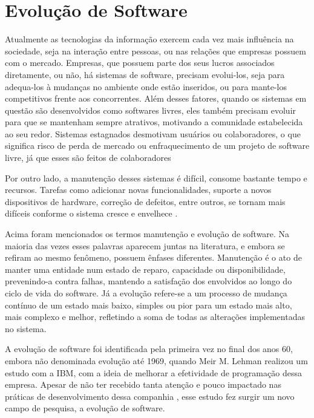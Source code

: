 \chapter{Evolução de Software}



Atualmente as tecnologias da informação exercem cada vez mais influência na sociedade, seja na interação entre pessoas, ou nas relações que empresas possuem com o mercado. Empresas, que possuem parte dos seus lucros associados diretamente, ou não, há sistemas de software, precisam evolui-los, seja para adequa-los à mudanças no ambiente onde estão inseridos, ou para mante-los competitivos frente aos concorrentes. Além desses fatores, quando os sistemas em questão são desenvolvidos como softwares livres, eles também precisam evoluir para que se mantenham sempre atrativos, motivando a comunidade estabelecida ao seu redor. Sistemas estagnados desmotivam usuários ou colaboradores, o que significa risco de perda de mercado ou enfraquecimento de um projeto de software livre, já que esses são feitos de colaboradores

Por outro lado, a manutenção desses sistemas é difícil, consome bastante tempo e recursos. Tarefas como adicionar novas funcionalidades, suporte a novos dispositivos de hardware, correção de defeitos, entre outros, se tornam mais difíceis conforme o sistema cresce e envelhece \cite{godfrey2000evolution}.

Acima foram mencionados os termos manutenção e evolução de software. Na maioria das vezes esses palavras aparecem juntas na literatura, e embora se refiram ao mesmo fenômeno, possuem ênfases diferentes. Manutenção é o ato de manter uma entidade num estado de reparo, capacidade ou disponibilidade, prevenindo-a contra falhas, mantendo a satisfação dos envolvidos ao longo do ciclo de vida do software. Já a evolução refere-se a um processo de mudança contínuo de um estado mais baixo, simples ou pior para um estado mais alto, mais complexo e melhor, refletindo a soma de todas as alterações implementadas no sistema.

A evolução de software foi identificada pela primeira vez no final dos anos 60, embora não denominada evolução até 1969, quando Meir M. Lehman realizou um estudo com a IBM, com a ideia de melhorar a efetividade de programação dessa empresa. Apesar de não ter recebido tanta atenção e pouco impactado nas práticas de desenvolvimento dessa companhia , esse estudo fez surgir um novo campo de pesquisa, a evolução de software.

